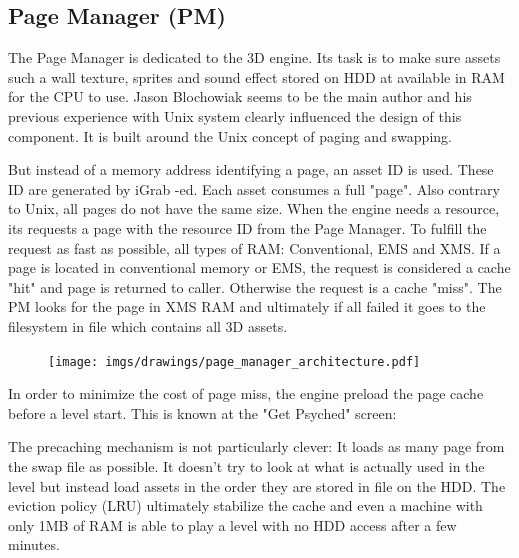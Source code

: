 \documentclass[book.tex]{subfiles}
\begin{document}
\subsection{Page Manager (PM)}
The Page Manager is dedicated to the 3D engine. Its task is to make sure assets such a wall texture, sprites and sound effect stored on HDD at available in RAM for the CPU to use. Jason Blochowiak seems to be the main author and his previous experience with Unix system clearly influenced the design of this component. It is built around the Unix concept of paging and swapping. \\
\par
But instead of a memory address identifying a page, an asset ID is used. These ID are generated by iGrab -ed. Each asset consumes a full "page". Also contrary to Unix, all pages do not have the same size. When the engine needs a resource, its requests a page with the resource ID from the Page Manager. To fulfill the request as fast as possible, all types of RAM: Conventional, EMS and XMS. If a page is located in conventional memory or EMS, the request is considered a cache "hit" and page is returned to caller. Otherwise the request is a cache "miss". The PM looks for the page in XMS RAM and ultimately if all failed it goes to the filesystem in file  which contains all 3D assets.\\
 \par
\begin{figure}[H]
\centering
 \texttt{[image: imgs/drawings/page\_manager\_architecture.pdf]}
 \end{figure}
 \par
In order to minimize the cost of page miss, the engine preload the page cache before a level start. This is known at the "Get Psyched" screen:
 \par
\begin{figure}[H]
\centering
 \end{figure}
 \par
The precaching mechanism is not particularly clever: It loads as many page from the swap file as possible. It doesn't try to look at what is actually used in the level but instead load assets in the order they are stored in  file on the HDD. The eviction policy (LRU) ultimately stabilize the cache and even a machine with only 1MB of RAM is able to play a level with no HDD access after a few minutes.\\
\end{document}
